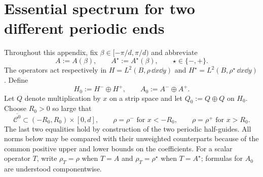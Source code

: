 
\section{Essential spectrum for two different periodic ends}
\label{app:essential-spectrum}

Throughout this appendix, fix
$\beta\in[-\pi/d,\pi/d)$ and abbreviate
\[
  A:=A(\beta),\qquad A^\star:=A^\star(\beta),
  \qquad \star\in\{-,+\}.
\]
The operators act respectively in
$H=L^2(B,\rho\,\dd x\dd y)$ and
$H^\star=L^2(B,\rho^\star\,\dd x\dd y)$.  Define
\begin{equation}
  H_0:=H^-\oplus H^+,
  \qquad A_0:=A^-\oplus A^+.
  \label{eq:appendix-free-operator}
\end{equation}
Let $Q$ denote multiplication by $x$ on a strip space and let
$Q_0:=Q\oplus Q$ on $H_0$.  Choose $R_0>0$ so large that
\[
  \overline{\mathcal C^0}\subset(-R_0,R_0)\times[0,d],
  \qquad
  \rho=\rho^-\text{ for }x<-R_0,
  \qquad
  \rho=\rho^+\text{ for }x>R_0.
\]
The last two equalities hold by construction of the two periodic half-guides.
All norms below may be compared with their unweighted counterparts because of
the common positive upper and lower bounds on the coefficients.
For a scalar operator $T$, write $\rho_T=\rho$ when $T=A$ and
$\rho_T=\rho^\star$ when $T=A^\star$; formulas for $A_0$ are understood
componentwise.

